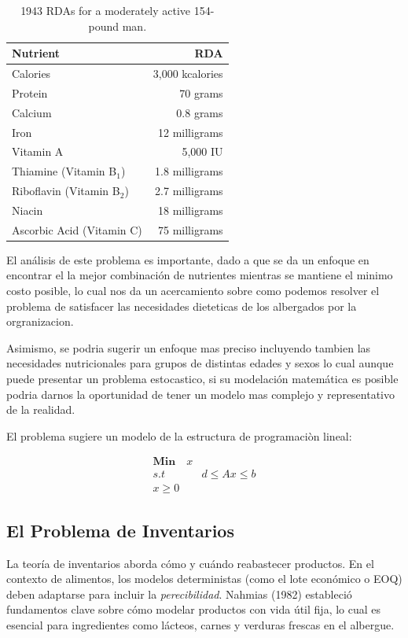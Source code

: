 \documentclass[12pt]{report}
\begin{document}
\begin{table}[H]
\centering
\caption{1943 RDAs for a moderately active 154-pound man.}
\label{tab:rda1943}
\begin{tabular}{@{}l r@{}}
\hline
\textbf{Nutrient} & \textbf{RDA} \\
\hline
Calories & 3,000 kcalories \\
Protein & 70 grams \\
Calcium & 0.8 grams \\
Iron & 12 milligrams \\
Vitamin A & 5,000 IU \\
Thiamine (Vitamin B$_1$) & 1.8 milligrams \\
Riboflavin (Vitamin B$_2$) & 2.7 milligrams \\
Niacin & 18 milligrams \\
Ascorbic Acid (Vitamin C) & 75 milligrams \\
\hline
\end{tabular}
\end{table}


El análisis de este problema es importante, dado a que se da un enfoque en encontrar el la mejor combinación de nutrientes mientras se mantiene el minimo costo posible, lo cual nos da un acercamiento sobre como podemos resolver el problema de satisfacer las necesidades dieteticas de los albergados por la orgranizacion. 

Asimismo, se podria sugerir un enfoque mas preciso incluyendo tambien las necesidades nutricionales para grupos de distintas edades y sexos lo cual aunque puede presentar un problema estocastico, si su modelación matemática es posible podria darnos la oportunidad de tener un modelo mas complejo y representativo de la realidad.

El problema sugiere un modelo de la estructura de programaciòn lineal:

\begin{align*}
  \mathbf{Min}\quad x\\
  s.t\quad & d\leq Ax \leq b\\
  x\geq 0
\end{align*}




\subsection{El Problema de Inventarios}
La teoría de inventarios aborda cómo y cuándo reabastecer productos. En el contexto de alimentos, los modelos deterministas (como el lote económico o EOQ) deben adaptarse para incluir la \textit{perecibilidad}. Nahmias (1982) estableció fundamentos clave sobre cómo modelar productos con vida útil fija, lo cual es esencial para ingredientes como lácteos, carnes y verduras frescas en el albergue.
\end{document}
